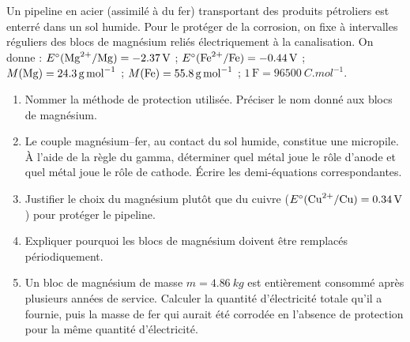 \documentclass[11pt]{article}
\begin{document}
\begin{exercice}
Un pipeline en acier (assimilé à du fer) transportant des produits pétroliers est enterré dans un sol humide. Pour le protéger de la corrosion, on fixe à intervalles réguliers des blocs de magnésium reliés électriquement à la canalisation. On donne : $E^\circ(\ce{Mg^2+}/\ce{Mg}) = \SI{-2,37}{V}$ ; $E^\circ(\ce{Fe^2+}/\ce{Fe}) = \SI{-0,44}{V}$ ; $M(\ce{Mg}) = \SI{24,3}{g.mol^{-1}}$ ; $M(\ce{Fe}) = \SI{55,8}{g.mol^{-1}}$ ; $1\,\mathrm{F} = \SI{96500}{C.mol^{-1}}$.
\begin{enumerate}
\item Nommer la méthode de protection utilisée. Préciser le nom donné aux blocs de magnésium.
\item Le couple magnésium--fer, au contact du sol humide, constitue une micropile. À l'aide de la règle du gamma, déterminer quel métal joue le rôle d'anode et quel métal joue le rôle de cathode. Écrire les demi-équations correspondantes.
\item Justifier le choix du magnésium plutôt que du cuivre ($E^\circ(\ce{Cu^2+}/\ce{Cu}) = \SI{+0,34}{V}$) pour protéger le pipeline.
\item Expliquer pourquoi les blocs de magnésium doivent être remplacés périodiquement.
\item Un bloc de magnésium de masse $m = \SI{4,86}{kg}$ est entièrement consommé après plusieurs années de service. Calculer la quantité d'électricité totale qu'il a fournie, puis la masse de fer qui aurait été corrodée en l'absence de protection pour la même quantité d'électricité.
\end{enumerate}
\end{exercice}
\end{document}
